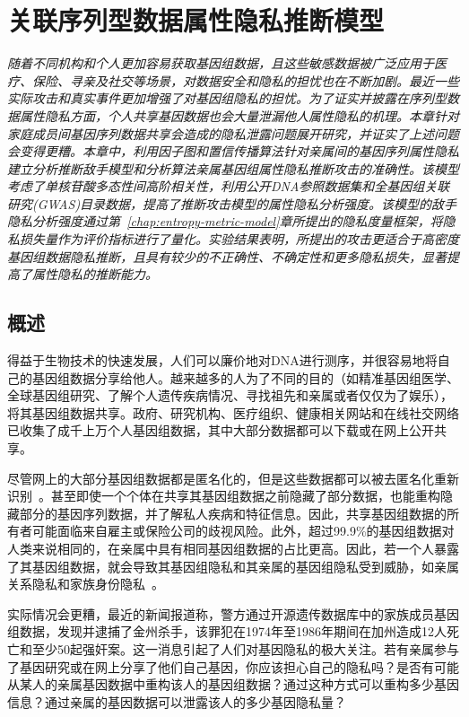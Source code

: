 \chapter{关联序列型数据属性隐私推断模型}
\label{chap:inference-attack-on-related-sequenced-data}
\textit{ }

\textit{随着不同机构和个人更加容易获取基因组数据，且这些敏感数据被广泛应用于医疗、保险、寻亲及社交等场景，对数据安全和隐私的担忧也在不断加剧。最近一些实际攻击和真实事件更加增强了对基因组隐私的担忧。为了证实并披露在序列型数据属性隐私方面，个人共享基因数据也会大量泄漏他人属性隐私的机理。本章针对家庭成员间基因序列数据共享会造成的隐私泄露问题展开研究，并证实了上述问题会变得更糟。本章中，利用因子图和置信传播算法针对亲属间的基因序列属性隐私建立分析推断敌手模型和分析算法亲属基因组属性隐私推断攻击的准确性。该模型考虑了单核苷酸多态性间高阶相关性，利用公开DNA参照数据集和全基因组关联研究(GWAS)目录数据，提高了推断攻击模型的属性隐私分析强度。该模型的敌手隐私分析强度通过第~\ref{chap:entropy-metric-model}章所提出的隐私度量框架，将隐私损失量作为评价指标进行了量化。实验结果表明，所提出的攻击更适合于高密度基因组数据隐私推断，且具有较少的不正确性、不确定性和更多隐私损失，显著提高了属性隐私的推断能力。}

\section{概述}
得益于生物技术的快速发展，人们可以廉价地对DNA进行测序，并很容易地将自己的基因组数据分享给他人。越来越多的人为了不同的目的（如精准基因组医学、全球基因组研究、了解个人遗传疾病情况、寻找祖先和亲属或者仅仅为了娱乐），将其基因组数据共享。政府、研究机构、医疗组织、健康相关网站和在线社交网络已收集了成千上万个人基因组数据，其中大部分数据都可以下载或在网上公开共享。

尽管网上的大部分基因组数据都是匿名化的，但是这些数据都可以被去匿名化重新识别~\cite{greenbaum2008genomic,humbert2015de}。甚至即使一个个体在共享其基因组数据之前隐藏了部分数据，也能重构隐藏部分的基因序列数据，并了解私人疾病和特征信息。因此，共享基因组数据的所有者可能面临来自雇主或保险公司的歧视风险。此外，超过99.9\%的基因组数据对人类来说相同的，在亲属中具有相同基因组数据的占比更高。因此，若一个人暴露了其基因组数据，就会导致其基因组隐私和其亲属的基因组隐私受到威胁，如亲属关系隐私和家族身份隐私~\cite{rohlfs2012familial}。


实际情况会更糟，最近的新闻报道称，警方通过开源遗传数据库中的家族成员基因组数据，发现并逮捕了金州杀手，该罪犯在1974年至1986年期间在加州造成12人死亡和至少50起强奸案。这一消息引起了人们对基因隐私的极大关注。若有亲属参与了基因研究或在网上分享了他们自己基因，你应该担心自己的隐私吗？是否有可能从某人的亲属基因数据中重构该人的基因组数据？通过这种方式可以重构多少基因信息？通过亲属的基因数据可以泄露该人的多少基因隐私量？

